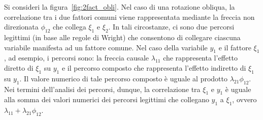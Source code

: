 Si consideri la figura~\ref{fig:2fact_obli}. 
Nel caso di una rotazione obliqua, la correlazione tra i due fattori comuni viene rappresentata mediante la freccia non direzionata $\phi_{12}$ che collega $\xi_1$ e $\xi_2$. 
In tali circostanze, ci sono due percorsi legittimi (in base alle regole di Wright) che consentono di collegare ciascuna variabile manifesta ad un fattore comune. 
Nel caso della variabile $y_1$ e il fattore $\xi_1$, ad esempio, i percorsi sono: la freccia causale $\lambda_{11}$ che rappresenta l'effetto diretto di $\xi_1$ su $y_1$ e  il percorso composto che rappresenta l'effetto indiretto di $\xi_1$ su $y_1$. 
Il valore numerico di tale percorso composto è uguale al prodotto $\lambda_{21}\phi_{12}$. 
Nei termini dell'analisi dei percorsi, dunque, la correlazione tra $\xi_1$ e $y_1$ è uguale alla somma dei valori numerici dei percorsi legittimi che collegano $y_1$ a $\xi_1$, ovvero $\lambda_{11} + \lambda_{21} \phi_{12}$.

